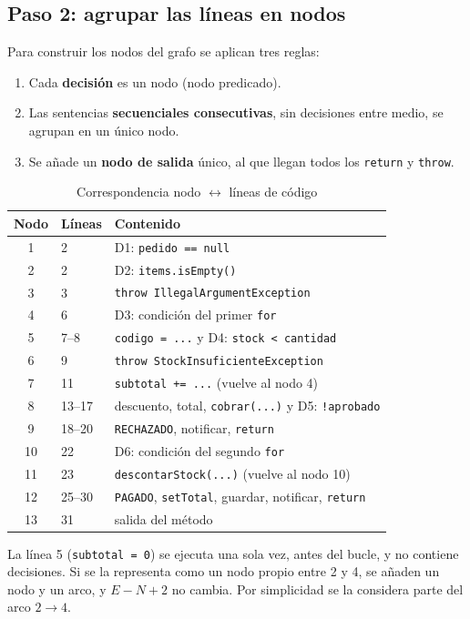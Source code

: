 \documentclass[11pt,a4paper,oneside]{report}
\newcommand{\code}[1]{\texttt{#1}}
\begin{document}
\subsection{Paso 2: agrupar las líneas en nodos}
Para construir los nodos del grafo se aplican tres reglas:
\begin{enumerate}
  \item Cada \textbf{decisión} es un nodo (nodo predicado).
  \item Las sentencias \textbf{secuenciales consecutivas}, sin decisiones entre medio, se agrupan en un único nodo.
  \item Se añade un \textbf{nodo de salida} único, al que llegan todos los \code{return} y \code{throw}.
\end{enumerate}

\begin{table}[H]
\centering
\caption{Correspondencia nodo $\leftrightarrow$ líneas de código}
\small
\begin{tabularx}{\linewidth}{clX}
\toprule
\textbf{Nodo} & \textbf{Líneas} & \textbf{Contenido}\\
\midrule
1 & 2 & D1: \code{pedido == null}\\
2 & 2 & D2: \code{items.isEmpty()}\\
3 & 3 & \code{throw IllegalArgumentException}\\
4 & 6 & D3: condición del primer \code{for}\\
5 & 7--8 & \code{codigo = ...} y D4: \code{stock < cantidad}\\
6 & 9 & \code{throw StockInsuficienteException}\\
7 & 11 & \code{subtotal += ...} (vuelve al nodo 4)\\
8 & 13--17 & descuento, total, \code{cobrar(...)} y D5: \code{!aprobado}\\
9 & 18--20 & \code{RECHAZADO}, notificar, \code{return}\\
10 & 22 & D6: condición del segundo \code{for}\\
11 & 23 & \code{descontarStock(...)} (vuelve al nodo 10)\\
12 & 25--30 & \code{PAGADO}, \code{setTotal}, guardar, notificar, \code{return}\\
13 & 31 & salida del método\\
\bottomrule
\end{tabularx}
\end{table}

\begin{nota}
La línea 5 (\code{subtotal = 0}) se ejecuta una sola vez, antes del bucle, y no contiene decisiones. Si se la representa como un nodo propio entre 2 y 4, se añaden un nodo y un arco, y $E - N + 2$ no cambia. Por simplicidad se la considera parte del arco $2 \rightarrow 4$.
\end{nota}
\end{document}
